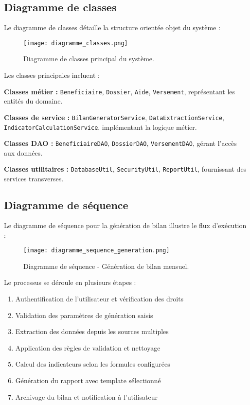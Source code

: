 \subsection{Diagramme de classes}

Le diagramme de classes détaille la structure orientée objet du système :

\begin{figure}[hbt!]
    \centering
    \texttt{[image: diagramme\_classes.png]}
    \caption{Diagramme de classes principal du système.}
    \label{fig:classes}
\end{figure}

Les classes principales incluent :

\medskip

\textbf{Classes métier :} \texttt{Beneficiaire}, \texttt{Dossier}, \texttt{Aide}, \texttt{Versement}, représentant les entités du domaine.

\textbf{Classes de service :} \texttt{BilanGeneratorService}, \texttt{DataExtractionService}, \texttt{IndicatorCalculationService}, implémentant la logique métier.

\textbf{Classes DAO :} \texttt{BeneficiaireDAO}, \texttt{DossierDAO}, \texttt{VersementDAO}, gérant l'accès aux données.

\textbf{Classes utilitaires :} \texttt{DatabaseUtil}, \texttt{SecurityUtil}, \texttt{ReportUtil}, fournissant des services transverses.

\subsection{Diagramme de séquence}

Le diagramme de séquence pour la génération de bilan illustre le flux d'exécution :

\begin{figure}[hbt!]
    \centering
    \texttt{[image: diagramme\_sequence\_generation.png]}
    \caption{Diagramme de séquence - Génération de bilan mensuel.}
    \label{fig:sequence-generation}
\end{figure}

Le processus se déroule en plusieurs étapes :

\begin{enumerate}
    \item Authentification de l'utilisateur et vérification des droits
    \item Validation des paramètres de génération saisis
    \item Extraction des données depuis les sources multiples
    \item Application des règles de validation et nettoyage
    \item Calcul des indicateurs selon les formules configurées
    \item Génération du rapport avec template sélectionné
    \item Archivage du bilan et notification à l'utilisateur
\end{enumerate}

